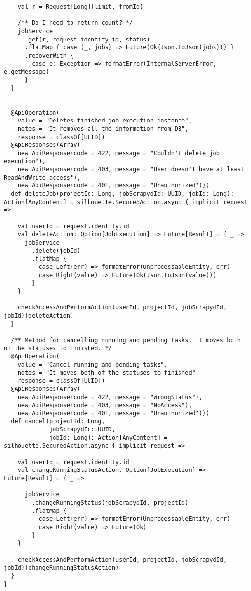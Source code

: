 \begin{lstlisting}
    val r = Request[Long](limit, fromId)

    /** Do I need to return count? */
    jobService
      .get(r, request.identity.id, status)
      .flatMap { case (_, jobs) => Future(Ok(Json.toJson(jobs))) }
      .recoverWith {
        case e: Exception => formatError(InternalServerError, e.getMessage)
      }
  }


  @ApiOperation(
    value = "Deletes finished job execution instance",
    notes = "It removes all the information from DB",
    response = classOf[UUID])
  @ApiResponses(Array(
    new ApiResponse(code = 422, message = "Couldn't delete job execution"),
    new ApiResponse(code = 403, message = "User doesn't have at least ReadAndWrite access"),
    new ApiResponse(code = 401, message = "Unauthorized")))
  def deleteJob(projectId: Long, jobScrapydId: UUID, jobId: Long): Action[AnyContent] = silhouette.SecuredAction.async { implicit request =>

    val userId = request.identity.id
    val deleteAction: Option[JobExecution] => Future[Result] = { _ =>
      jobService
        .delete(jobId)
        .flatMap {
          case Left(err) => formatError(UnprocessableEntity, err)
          case Right(value) => Future(Ok(Json.toJson(value)))
        }
    }

    checkAccessAndPerformAction(userId, projectId, jobScrapydId, jobId)(deleteAction)
  }

  /** Method for cancelling running and pending tasks. It moves both of the statuses to finished. */
  @ApiOperation(
    value = "Cancel running and pending tasks",
    notes = "It moves both of the statuses to finished",
    response = classOf[UUID])
  @ApiResponses(Array(
    new ApiResponse(code = 422, message = "WrongStatus"),
    new ApiResponse(code = 403, message = "NoAccess"),
    new ApiResponse(code = 401, message = "Unauthorized")))
  def cancel(projectId: Long,
             jobScrapydId: UUID,
             jobId: Long): Action[AnyContent] = silhouette.SecuredAction.async { implicit request =>

    val userId = request.identity.id
    val changeRunningStatusAction: Option[JobExecution] => Future[Result] = { _ =>

      jobService
        .changeRunningStatus(jobScrapydId, projectId)
        .flatMap {
          case Left(err) => formatError(UnprocessableEntity, err)
          case Right(value) => Future(Ok)
        }
    }

    checkAccessAndPerformAction(userId, projectId, jobScrapydId, jobId)(changeRunningStatusAction)
  }
}
\end{lstlisting}
